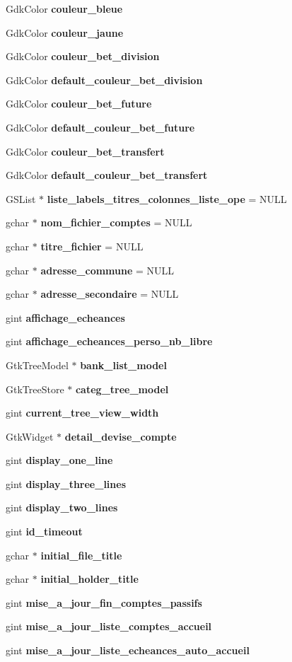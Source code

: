 \begin{DoxyCompactItemize}
\item 
GdkColor {\bf couleur\_\-bleue}
\item 
GdkColor {\bf couleur\_\-jaune}
\item 
GdkColor {\bf couleur\_\-bet\_\-division}
\item 
GdkColor {\bf default\_\-couleur\_\-bet\_\-division}
\item 
GdkColor {\bf couleur\_\-bet\_\-future}
\item 
GdkColor {\bf default\_\-couleur\_\-bet\_\-future}
\item 
GdkColor {\bf couleur\_\-bet\_\-transfert}
\item 
GdkColor {\bf default\_\-couleur\_\-bet\_\-transfert}
\item 
GSList $\ast$ {\bf liste\_\-labels\_\-titres\_\-colonnes\_\-liste\_\-ope} = NULL
\item 
gchar $\ast$ {\bf nom\_\-fichier\_\-comptes} = NULL
\item 
gchar $\ast$ {\bf titre\_\-fichier} = NULL
\item 
gchar $\ast$ {\bf adresse\_\-commune} = NULL
\item 
gchar $\ast$ {\bf adresse\_\-secondaire} = NULL
\item 
gint {\bf affichage\_\-echeances}
\item 
gint {\bf affichage\_\-echeances\_\-perso\_\-nb\_\-libre}
\item 
GtkTreeModel $\ast$ {\bf bank\_\-list\_\-model}
\item 
GtkTreeStore $\ast$ {\bf categ\_\-tree\_\-model}
\item 
gint {\bf current\_\-tree\_\-view\_\-width}
\item 
GtkWidget $\ast$ {\bf detail\_\-devise\_\-compte}
\item 
gint {\bf display\_\-one\_\-line}
\item 
gint {\bf display\_\-three\_\-lines}
\item 
gint {\bf display\_\-two\_\-lines}
\item 
gint {\bf id\_\-timeout}
\item 
gchar $\ast$ {\bf initial\_\-file\_\-title}
\item 
gchar $\ast$ {\bf initial\_\-holder\_\-title}
\item 
gint {\bf mise\_\-a\_\-jour\_\-fin\_\-comptes\_\-passifs}
\item 
gint {\bf mise\_\-a\_\-jour\_\-liste\_\-comptes\_\-accueil}
\item 
gint {\bf mise\_\-a\_\-jour\_\-liste\_\-echeances\_\-auto\_\-accueil}

\end{DoxyCompactItemize}
